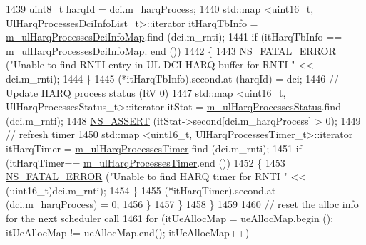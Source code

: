 \begin{DoxyCode}
1439                                 uint8\_t harqId = dci.m\_harqProcess;
1440                                 std::map <uint16\_t, UlHarqProcessesDciInfoList\_t>::iterator itHarqTbInfo = 
      \hyperlink{classns3_1_1MmWaveFlexTtiPfMacScheduler_a8b50ed4fc6df0561404f4aad5aa3d384}{m\_ulHarqProcessesDciInfoMap}.find (dci.m\_rnti);
1441                                 \textcolor{keywordflow}{if} (itHarqTbInfo == \hyperlink{classns3_1_1MmWaveFlexTtiPfMacScheduler_a8b50ed4fc6df0561404f4aad5aa3d384}{m\_ulHarqProcessesDciInfoMap}.
      end ())
1442                                 \{
1443                                         \hyperlink{group__fatal_ga5131d5e3f75d7d4cbfd706ac456fdc85}{NS\_FATAL\_ERROR} (\textcolor{stringliteral}{"Unable to find RNTI entry in UL DCI
       HARQ buffer for RNTI "} << dci.m\_rnti);
1444                                 \}
1445                                 (*itHarqTbInfo).second.at (harqId) = dci;
1446                                 \textcolor{comment}{// Update HARQ process status (RV 0)}
1447                                 std::map <uint16\_t, UlHarqProcessesStatus\_t>::iterator itStat = 
      \hyperlink{classns3_1_1MmWaveFlexTtiPfMacScheduler_aee0051900f7d928d25d577ad83983bf4}{m\_ulHarqProcessesStatus}.find (dci.m\_rnti);
1448                                 \hyperlink{assert_8h_a6dccdb0de9b252f60088ce281c49d052}{NS\_ASSERT} (itStat->second[dci.m\_harqProcess] > 0);
1449                                 \textcolor{comment}{// refresh timer}
1450                                 std::map <uint16\_t, UlHarqProcessesTimer\_t>::iterator itHarqTimer =  
      \hyperlink{classns3_1_1MmWaveFlexTtiPfMacScheduler_ac22941904760bb3380302039caad87e0}{m\_ulHarqProcessesTimer}.find (dci.m\_rnti);
1451                                 \textcolor{keywordflow}{if} (itHarqTimer== \hyperlink{classns3_1_1MmWaveFlexTtiPfMacScheduler_ac22941904760bb3380302039caad87e0}{m\_ulHarqProcessesTimer}.end ())
1452                                 \{
1453                                         \hyperlink{group__fatal_ga5131d5e3f75d7d4cbfd706ac456fdc85}{NS\_FATAL\_ERROR} (\textcolor{stringliteral}{"Unable to find HARQ timer for RNTI "}
       << (uint16\_t)dci.m\_rnti);
1454                                 \}
1455                                 (*itHarqTimer).second.at (dci.m\_harqProcess) = 0;
1456                         \}
1457                 \}
1458         \}
1459 
1460         \textcolor{comment}{// reset the alloc info for the next scheduler call}
1461         \textcolor{keywordflow}{for} (itUeAllocMap = ueAllocMap.begin (); itUeAllocMap != ueAllocMap.end(); itUeAllocMap++)

\end{DoxyCode}
